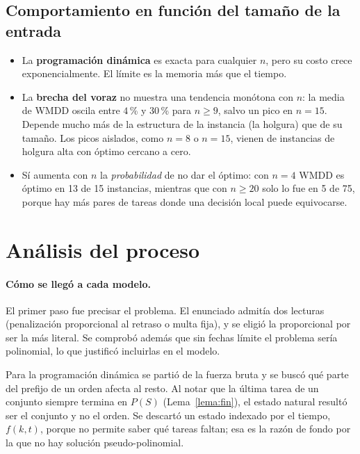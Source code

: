 \documentclass[10pt,twocolumn,letterpaper]{article}
\begin{document}
\subsection{Comportamiento en función del tamaño de la entrada}

\begin{itemize}
  \item La \textbf{programación dinámica} es exacta para cualquier $n$, pero su
        costo crece exponencialmente. El límite es la memoria más que el
        tiempo.
  \item La \textbf{brecha del voraz} no muestra una tendencia monótona con
        $n$: la media de WMDD oscila entre $4$\,\% y $30$\,\% para
        $n\ge9$, salvo un pico en $n=15$. Depende mucho más de la estructura de la instancia (la
        holgura) que de su tamaño. Los picos aislados, como $n=8$ o $n=15$,
        vienen de instancias de holgura alta con óptimo cercano a cero.
  \item Sí aumenta con $n$ la \emph{probabilidad} de no dar el óptimo: con
        $n=4$ WMDD es óptimo en 13 de 15 instancias, mientras que con
        $n\ge20$ solo lo fue en 5 de 75, porque hay más pares de tareas donde una
        decisión local puede equivocarse.
\end{itemize}

\section{Análisis del proceso}

\paragraph{Cómo se llegó a cada modelo.} El primer paso fue precisar el
problema. El enunciado admitía dos lecturas (penalización proporcional al
retraso o multa fija), y se eligió la proporcional por ser la más literal. Se
comprobó además que sin fechas límite el problema sería polinomial, lo que
justificó incluirlas en el modelo.

Para la programación dinámica se partió de la fuerza bruta y se buscó qué parte
del prefijo de un orden afecta al resto. Al notar que la última tarea de un
conjunto siempre termina en $P(S)$ (Lema~\ref{lema:fin}), el estado natural
resultó ser el conjunto y no el orden. Se descartó un estado indexado por el
tiempo, $f(k,t)$, porque no permite saber qué tareas faltan; esa es la razón
de fondo por la que no hay solución pseudo-polinomial.
\end{document}
